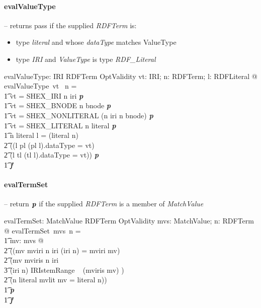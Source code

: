 \documentclass[fuzz]{llncs}
\def\entryFor{\cdot}
\def\pass{\textbf{\textit{p}}}
\def\fail{\textbf{\textit{f}}}
\def\zc{\textit}
\begin{document}
\paragraph{evalValueType} -- returns pass if the supplied \zc{RDFTerm} is:
\begin{itemize}
\item type \zc{literal} and whose \zc{dataType} matches ValueType
\item type \zc{IRI} and \zc{ValueType} is type \zc{RDF\_Literal}
\end{itemize}
\begin{gendef}
   evalValueType: IRI \pfun RDFTerm \pfun OptValidity
\where
   \forall vt: IRI; n: RDFTerm; l: RDFLiteral @ evalValueType~vt~ n = \\
\t1 \IF vt = SHEX\_IRI \land  n \in \ran iri \THEN \pass \\
\t1 \ELSE \IF vt = SHEX\_BNODE \land  n \in \ran bnode \THEN \pass \\
\t1 \ELSE \IF vt = SHEX\_NONLITERAL \land  (n \in \ran iri \lor n \in \ran bnode) \THEN \pass \\
\t1 \ELSE \IF vt = SHEX\_LITERAL \land  n \in \ran literal \THEN \pass \\
\t1 \ELSE \IF n \in \ran literal \land l = (literal \entryFor n) \land \\
\t2 ((l \in \ran pl \land (pl \entryFor l).dataType = vt) \lor \\
\t2  (l \in \ran tl \land (tl \entryFor l).dataType = vt)) \THEN \pass \\
\t1 \ELSE \fail
\end{gendef}

\paragraph{evalTermSet} -- return $\pass$ if the supplied \zc{RDFTerm} is a member of \zc{MatchValue}
\begin{gendef}
   evalTermSet: \power MatchValue \pfun RDFTerm \pfun OptValidity
\where
   \forall mvs: \power MatchValue; n: RDFTerm @ evalTermSet~mvs~n = \\
\t1	\IF \exists mv: mvs @ \\
\t2 ((mv \in \ran mviri \land n \in \ran iri \land (iri \entryFor n) = mviri \entryFor mv) \lor \\
\t2  (mv \in \ran mviris \land n \in \ran iri \land  \\
\t3 (iri \entryFor n) \in IRIstemRange ~ (mviris \entryFor mv) ) \lor \\
\t2  (n \in \ran literal \land mvlit \entryFor mv = literal \entryFor n)) \\
\t1 \THEN \pass \\
\t1 \ELSE \fail
\end{gendef}
\end{document}
